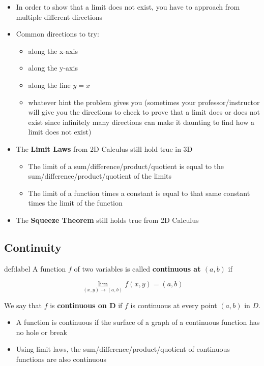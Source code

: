 \documentclass{package/notes}
\begin{document}
\begin{itemize}
\begin{itemize}
	\item In order to show that a limit does not exist, you have to approach from multiple different directions
	\item Common directions to try:
	\begin{itemize}
		\item along the x-axis
		\item along the y-axis
		\item along the line $y=x$
		\item whatever hint the problem gives you (sometimes your professor/instructor will give you the directions to check to prove that a limit does or does not exist since infinitely many directions can make it daunting to find how a limit does not exist)
	\end{itemize}
	\item The \textbf{Limit Laws} from 2D Calculus still hold true in 3D
	\begin{itemize}
		\item The limit of a sum/difference/product/quotient is equal to the sum/difference/product/quotient of the limits
		\item The limit of a function times a constant is equal to that same constant times the limit of the function
	\end{itemize}
	\item The \textbf{Squeeze Theorem} still holds true from 2D Calculus
	\end{itemize}
\end{itemize}

\subsection{Continuity}

\begin{definition}[Continuity in 3D]{def:label}
	A function $f$ of two variables is called \textbf{continuous at $(a,b)$} if

	$$\lim_{(x,y)\to (a,b)} f(x,y) = (a,b)$$

	We say that $f$ is \textbf{continuous on D} if $f$ is continuous at every point $(a,b)$ in $D$.
\end{definition}

\begin{itemize}
	\item A function is continuous if the surface of a graph of a continuous function has no hole or break
	\item Using limit laws, the sum/difference/product/quotient of continuous functions are also continuous
\end{itemize}
\end{document}
